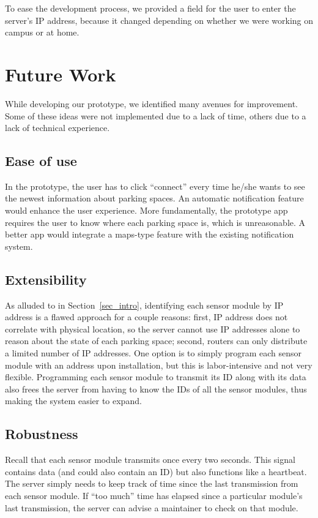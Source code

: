\documentclass[conference]{IEEEtran}
\begin{document}
To ease the development process, we provided a field for the user to enter the server's IP address, because it changed depending on whether we were working on campus or at home.

\section{Future Work}\label{sec_futurework}
While developing our prototype, we identified many avenues for improvement. Some of these ideas were not implemented due to a lack of time, others due to a lack of technical experience.
\subsection{Ease of use}
In the prototype, the user has to click ``connect'' every time he/she wants to see the newest information about parking spaces. An automatic notification feature would enhance the user experience. More fundamentally, the prototype app requires the user to know where each parking space is, which is unreasonable. A better app would integrate a maps-type feature with the existing notification system.
\subsection{Extensibility}
As alluded to in Section~\ref{sec_intro}, identifying each sensor module by IP address is a flawed approach for a couple reasons: first, IP address does not correlate with physical location, so the server cannot use IP addresses alone to reason about the state of each parking space; second, routers can only distribute a limited number of IP addresses. One option is to simply program each sensor module with an address upon installation, but this is labor-intensive and not very flexible. Programming each sensor module to transmit its ID along with its data also frees the server from having to know the IDs of all the sensor modules, thus making the system easier to expand.
\subsection{Robustness}
Recall that each sensor module transmits once every two seconds. This signal contains data (and could also contain an ID) but also functions like a heartbeat. The server simply needs to keep track of time since the last transmission from each sensor module. If ``too much'' time has elapsed since a particular module's last transmission, the server can advise a maintainer to check on that module.
\end{document}
